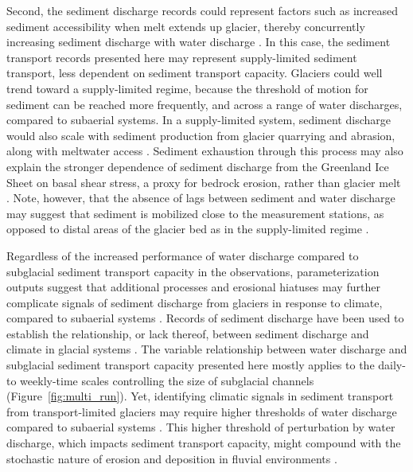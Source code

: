 \documentclass[11pt]{article}
\begin{document}
Second, the sediment discharge records could represent factors such as increased sediment accessibility when melt extends up glacier, thereby concurrently increasing sediment discharge with water discharge \citep[e.g.][]{delaney2020}.
In this case, the sediment transport records presented here may represent supply-limited sediment transport, less dependent on sediment transport capacity.
Glaciers could well trend toward a supply-limited regime, because the threshold of motion for sediment can be reached more frequently, and across a range of water discharges, compared to subaerial systems.
In a supply-limited system, sediment discharge would also scale with sediment production from glacier quarrying and abrasion, along with meltwater access \citep[e.g.][]{herman2015,ugelvig2018,delaney2023}.
 Sediment exhaustion through this process may also explain the stronger dependence of sediment discharge from the Greenland Ice Sheet on basal shear stress, a proxy for bedrock erosion, rather than glacier melt \citep{overeem2017}.
Note, however, that the absence of lags between sediment and water discharge may suggest that sediment is mobilized close to the measurement stations, as opposed to distal areas of the glacier bed as in the supply-limited regime \citep[Figure~\ref{fig:model_outs}\,a and e][]{williams1989}.

Regardless of the increased performance of water discharge compared to subglacial sediment transport capacity in the observations, parameterization outputs suggest that additional processes and erosional hiatuses may further complicate signals of sediment discharge from glaciers in response to climate, compared to subaerial systems \citep{jansson2005,ganti2016}.
Records of sediment discharge have been used to establish the relationship, or lack thereof, between sediment discharge and climate in glacial systems \citep[e.g.][]{koppes2009a,willenbring2016,mariotti2021}.
The variable relationship between water discharge and subglacial sediment transport capacity presented here mostly applies to the daily- to weekly-time scales controlling the size of subglacial channels (Figure~\ref{fig:multi_run}).
Yet, identifying climatic signals in sediment transport from transport-limited glaciers may require higher thresholds of water discharge compared to subaerial systems \citep[Figure~\ref{fig:Qw_vari}][]{tofelde2021}.
This higher threshold of perturbation by water discharge, which impacts sediment transport capacity, might compound with the stochastic nature of erosion and deposition in fluvial environments \citep{castletort2003,jerolmack2010,romans2016}.
\end{document}
